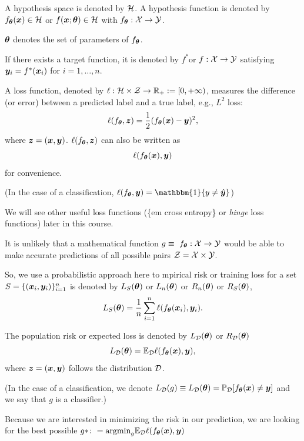 \documentclass{beamer}
\begin{document}
\begin{frame}[allowframebreaks]
  \begin{definition}  
  A hypothesis space is denoted by $\mathcal{H}$. A hypothesis function is denoted by $f_{\bm{\theta}}(\bm{x})\in\mathcal{H}$ or $f(\bm{x};\bm{\theta})\in\mathcal{H}$ with $f_{\bm{\theta}}:\mathcal{X}\to\mathcal{Y}$.
  \end{definition}
  
  $\bm{\theta}$  denotes the set of parameters of $f_{\bm{\theta}}$.
  
  If there exists a target function, it is denoted by $f^*$or $f:\mathcal{X}\to\mathcal{Y}$ satisfying $\bm{y}_i=f^*(\bm{x}_i)$ for $i=1,\ldots,n$.
  
  A loss function, denoted by $\ell:\mathcal{H}\times\mathcal{Z}\to\mathbb{R}_+:=[0,+\infty)$, measures the difference (or error) between a predicted label and a true label, e.g., $L^2$ loss:
  \[
      \ell(f_{\bm{\theta}},\bm{z})=\frac{1}{2}(f_{\bm{\theta}}(\bm{x})-\bm{y})^2,
  \]
  where $\bm{z}=(\bm{x},\bm{y})$. $\ell(f_{\bm{\theta}},\bm{z})$ can also be written as
  \[
      \ell(f_{\bm{\theta}}(\bm{x}),\bm{y})
  \]
  for convenience.
  
  (In the case of a classification, $\ell(f_{\vtheta},\vy)=\mathbbm{1}\{y\neq \hat{\vy}\}$)

We will see other useful loss functions (\{em cross entropy\} or {\em hinge} loss functions) later in this course.

It is unlikely that a mathematical function $g \equiv \ f_{\bm{\theta}}:\mathcal{X}\to\mathcal{Y}$ would be able to make accurate predictions of all possible pairs $\mathcal{Z}=\mathcal{X}\times\mathcal{Y}$.

  So, we use a probabilistic approach here to mpirical risk or training loss for a set $S=\{(\bm{x}_i,\bm{y}_i)\}_{i=1}^{n}$ is denoted by  $L_S(\bm{\theta})$ or $L_{n}(\bm{\theta})$ or $R_{n}(\bm{\theta})$ or $R_{S}(\bm{\theta})$,
  \begin{equation}
      L_S(\bm{\theta}) =\frac{1}{n}\sum_{i=1}^n\ell(f_{\bm{\theta}}(\bm{x}_i),\bm{y}_i).
  \end{equation}
  
  The population risk or expected loss is denoted by $L_{\mathcal{D}}(\bm{\theta})$ or $R_{\mathcal{D}}(\bm{\theta})$
  \begin{equation}
      L_{\mathcal{D}}(\bm{\theta}) =\mathbb{E}_{\mathcal{D}}\ell(f_{\bm{\theta}}(\bm{x}),\bm{y}),
  \end{equation}
  where $\bm{z}=(\bm{x},\bm{y})$ follows the distribution $\mathcal{D}$.
   
  (In the case of a classification, we denote $L_{\mathcal{D}}(g) \equiv L_{\mathcal{D}}(\bm{\theta}) = \mathbb{P}_{\mathcal{D}} [f_{\bm{\theta}}(\bm{x}) \neq \bm{y}]$ and we say that $g$ is a classifier.)

  Because we are interested in minimizing the risk in our prediction, we are looking for the best possible $g* \colon = \mathrm{argmin}_g \mathbb{E}_{\mathcal{D}}\ell(f_{\bm{\theta}}(\bm{x}),\bm{y})$


\end{frame}
\end{document}
